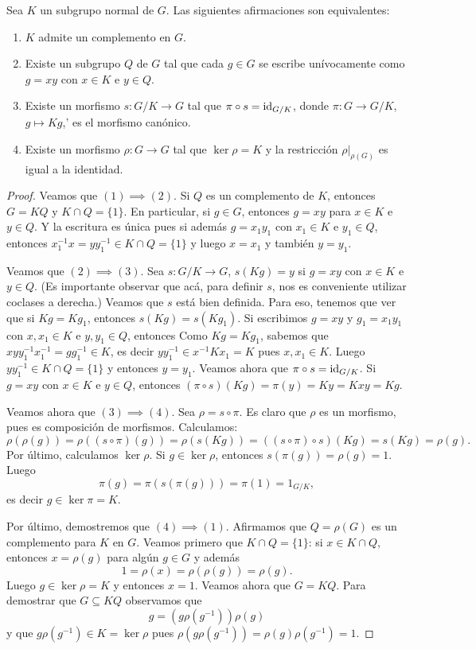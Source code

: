 \begin{proposition}
Sea $K$ un subgrupo normal de $G$. Las siguientes afirmaciones son equivalentes:
\begin{enumerate}
\item $K$ admite un complemento en $G$.
\item Existe 	un subgrupo $Q$ de $G$ tal que cada $g\in G$ se escribe unívocamente como $g=xy$ con $x\in K$ e $y\in Q$.
\item Existe un morfismo $s\colon G/K\to G$ tal que $\pi\circ s=\operatorname{id}_{G/K}$, donde $\pi\colon G\to G/K$, $g\mapsto Kg$,' es el morfismo canónico.
\item Existe un morfismo $\rho\colon G\to G$ tal que $\ker\rho=K$ y la restricción $\rho|_{\rho(G)}$ es igual a la identidad.  
\end{enumerate}
\end{proposition}

\begin{proof}
Veamos que $(1)\implies(2)$. Si $Q$ es un complemento de $K$, entonces $G=KQ$ y $K\cap Q=\{1\}$. En particular, si $g\in G$, entonces $g=xy$ para $x\in K$ e $y\in Q$. Y la escritura es única pues si además $g=x_1y_1$ con $x_1\in K$ e $y_1\in Q$, entonces $x_1^{-1}x=yy_1^{-1}\in K\cap Q=\{1\}$ y luego $x=x_1$ y también $y=y_1$.  

Veamos que $(2)\implies(3)$. Sea $s\colon G/K\to G$, $s(Kg)=y$ si $g=xy$ con $x\in K$ e $y\in Q$. (Es importante observar que 
acá, para definir $s$, nos es conveniente utilizar coclases a derecha.) Veamos que $s$ está bien definida. Para eso, tenemos que ver que si $Kg=Kg_1$, entonces $s(Kg)=s(Kg_1)$. Si escribimos $g=xy$ y $g_1=x_1y_1$ con $x,x_1\in K$ e $y,y_1\in Q$, entonces
Como $Kg=Kg_1$, sabemos que $xyy_1^{-1}x_1^{-1}=gg_1^{-1}\in K$, es decir $yy_1^{-1}\in x^{-1}Kx_1=K$ pues $x,x_1\in K$. Luego $yy_1^{-1}\in K\cap Q=\{1\}$ y entonces $y=y_1$. Veamos ahora que $\pi\circ s=\operatorname{id}_{G/K}$. Si $g=xy$ con $x\in K$ e $y\in Q$, entonces  
$(\pi\circ s)(Kg)=\pi(y)=Ky=Kxy=Kg$.

Veamos ahora que $(3)\implies(4)$. Sea $\rho=s\circ\pi$. Es claro que $\rho$ es un morfismo, pues es composición de morfismos. Calculamos:
\[
\rho(\rho(g))=\rho( (s\circ\pi)(g))=\rho(s(Kg))=((s\circ\pi)\circ s)(Kg)=s(Kg)=\rho(g).
\]
Por último, calculamos $\ker\rho$. Si $g\in\ker\rho$, entonces $s(\pi(g))=\rho(g)=1$. Luego
\[
\pi(g)=\pi(s(\pi(g)))=\pi(1)=1_{G/K},
\]  
es decir $g\in\ker\pi=K$. 

Por último, demostremos que $(4)\implies(1)$. Afirmamos que $Q=\rho(G)$ es un complemento para $K$ en $G$. Veamos primero que $K\cap Q=\{1\}$: si $x\in K\cap Q$, entonces $x=\rho(g)$ para algún $g\in G$ y además 
\[
1=\rho(x)=\rho(\rho(g))=\rho(g).
\]
Luego $g\in\ker\rho=K$ y entonces $x=1$. Veamos ahora que $G=KQ$. Para demostrar que $G\subseteq KQ$ observamos que
\[
g=(g\rho(g^{-1}))\rho(g)
\]
y que $g\rho(g^{-1})\in K=\ker\rho$ pues $\rho(g\rho(g^{-1}))=	\rho(g)\rho(g^{-1})=1$.  
\end{proof}

